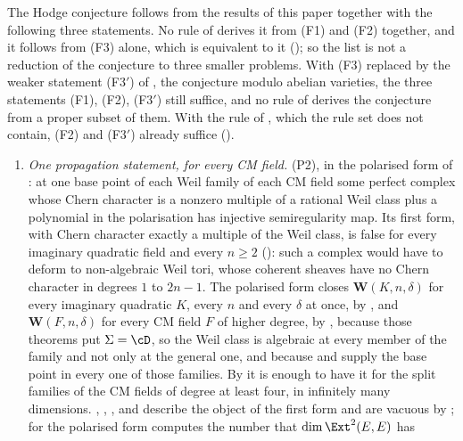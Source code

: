 \begin{corollary}\label{cor:fourremain}
The Hodge conjecture follows from the results of this paper together with the
following three statements. No rule of  derives it from
(F1) and (F2) together, and it follows from (F3) alone, which is equivalent
to it
(); so the list is not a reduction of the conjecture to
three smaller problems. With (F3) replaced by the weaker statement
\textup{(F3$'$)} of , the conjecture modulo abelian
varieties, the three statements (F1), (F2), \textup{(F3$'$)} still suffice,
and no rule of  derives the conjecture from a proper
subset of them. With the rule of , which the rule set does
not contain, (F2) and \textup{(F3$'$)} already suffice ().
\begin{enumerate}[label=\textup{(F\arabic*)},leftmargin=3.0em,itemsep=4pt]
\item \emph{One propagation statement, for every CM field.} \textup{(P2)},
  in the polarised form of : at one base point of each
  Weil family of each CM field some perfect complex whose Chern character is
  a nonzero multiple of a rational Weil class plus a polynomial in the
  polarisation has injective semiregularity map. Its first form, with Chern
  character exactly a multiple of the Weil class, is false for every
  imaginary quadratic field and every $n\ge2$ (): such a
  complex would have to deform to non-algebraic Weil tori, whose coherent
  sheaves have no Chern character in degrees $1$ to $2n-1$. The polarised form
  closes
  $\mathbf{W}(K,n,\delta)$
  for every imaginary quadratic $K$, every $n$ and every $\delta$ at once, by
  , and
  $\mathbf{W}(F,n,\delta)$ for every CM field $F$ of higher degree, by
  \cite[Theorem~17.7]{paperI}, because those theorems put $\Sigma=\cD$, so the
  Weil class is algebraic at every member of the family and not only at the
  general one, and because \cite[Theorem~15.27]{paperI} and \cite[Theorem~17.5]{paperI}
  supply the base point in every one of those families. By
   it is enough to have it for the split families of the
  CM fields of degree at least four, in infinitely many dimensions.
  , , ,
   and  describe the object of the
  first form and are vacuous by ; for the polarised form
   computes the number that $\dim\Ext^{2}(E,E)$ has

\end{enumerate}
\end{corollary}
